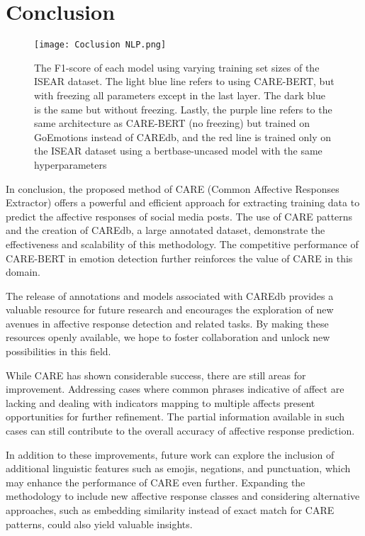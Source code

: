 \documentclass[conference]{IEEEtran}
\begin{document}
\section{Conclusion}
\begin{figure}[h]
    \centering
    \texttt{[image: Coclusion NLP.png]}
    \caption{The F1-score of each model using varying
training set sizes of the ISEAR dataset. The light blue
line refers to using CARE-BERT, but with freezing all
parameters except in the last layer. The dark blue is the
same but without freezing. Lastly, the purple line refers
to the same architecture as CARE-BERT (no freezing) but
trained on GoEmotions instead of CAREdb, and the red
line is trained only on the ISEAR dataset using a bertbase-uncased model with the same hyperparameters}
    \label{fig:6}
\end{figure}
In conclusion, the proposed method of CARE (Common Affective Responses Extractor) offers a powerful and efficient approach for extracting training data to predict the affective responses of social media posts. The use of CARE patterns and the creation of CAREdb, a large annotated dataset, demonstrate the effectiveness and scalability of this methodology. The competitive performance of CARE-BERT in emotion detection further reinforces the value of CARE in this domain.

The release of annotations and models associated with CAREdb provides a valuable resource for future research and encourages the exploration of new avenues in affective response detection and related tasks. By making these resources openly available, we hope to foster collaboration and unlock new possibilities in this field.

While CARE has shown considerable success, there are still areas for improvement. Addressing cases where common phrases indicative of affect are lacking and dealing with indicators mapping to multiple affects present opportunities for further refinement. The partial information available in such cases can still contribute to the overall accuracy of affective response prediction.

In addition to these improvements, future work can explore the inclusion of additional linguistic features such as emojis, negations, and punctuation, which may enhance the performance of CARE even further. Expanding the methodology to include new affective response classes and considering alternative approaches, such as embedding similarity instead of exact match for CARE patterns, could also yield valuable insights.
\end{document}
